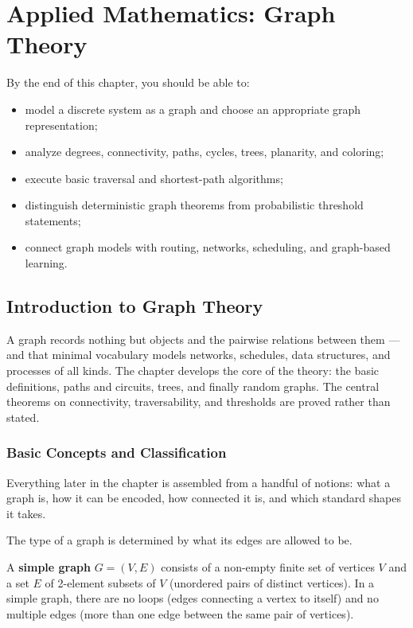 \chapter{Applied Mathematics: Graph Theory}

\begin{learningobjectives}
By the end of this chapter, you should be able to:
\begin{itemize}
    \item model a discrete system as a graph and choose an appropriate graph representation;
    \item analyze degrees, connectivity, paths, cycles, trees, planarity, and coloring;
    \item execute basic traversal and shortest-path algorithms;
    \item distinguish deterministic graph theorems from probabilistic threshold statements;
    \item connect graph models with routing, networks, scheduling, and graph-based learning.
\end{itemize}
\end{learningobjectives}

\section{Introduction to Graph Theory}

A graph records nothing but objects and the pairwise relations between them — and that minimal vocabulary models networks, schedules, data structures, and processes of all kinds. The chapter develops the core of the theory: the basic definitions, paths and circuits, trees, and finally random graphs. The central theorems on connectivity, traversability, and thresholds are proved rather than stated.

\subsection{Basic Concepts and Classification}

Everything later in the chapter is assembled from a handful of notions: what a graph is, how it can be encoded, how connected it is, and which standard shapes it takes.

The type of a graph is determined by what its edges are allowed to be.

\begin{definition}
A \textbf{simple graph} $G = (V, E)$ consists of a non-empty finite set of vertices $V$ and a set $E$ of 2-element subsets of $V$ (unordered pairs of distinct vertices). In a simple graph, there are no loops (edges connecting a vertex to itself) and no multiple edges (more than one edge between the same pair of vertices).
\end{definition}

